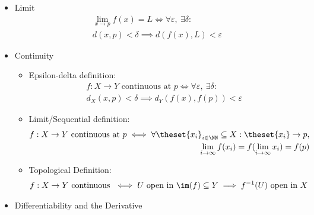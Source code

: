 \begin{itemize}
\item
  Limit
  \begin{align*}
    \lim_{x \to p} f(x) = L \iff \forall\varepsilon,~\exists\delta:\\
    d(x, p) < \delta\implies d(f(x), L) < \varepsilon
    \end{align*}
\item
  Continuity

  \begin{itemize}
  \item
    Epsilon-delta definition:
    \begin{align*}
      f:X \to Y \text{ continuous at } p \iff
      \forall \varepsilon,~ \exists\delta:\\
      d_X(x, p) < \delta \implies d_Y(f(x), f(p)) < \varepsilon
      \end{align*}
  \item
    Limit/Sequential definition:
    \begin{align*}
      f:X \to Y \text{ continuous at } p \iff
      \forall \theset{x_i}_{i\in \NN}\subseteq X: \theset{x_i}\to p,\\
      \lim_{i\to\infty}f(x_i) = f(\lim_{i\to\infty}x_i) = f(p)
      \end{align*}
  \item
    Topological Definition:
    \begin{align*}
      f:X \to Y \text{ continuous } \iff U \text{ open in } \im(f) \subseteq Y \implies f^{-1}(U) \text{ open in } X  
      \end{align*}
  \end{itemize}
\item
  Differentiability and the Derivative


\end{itemize}
